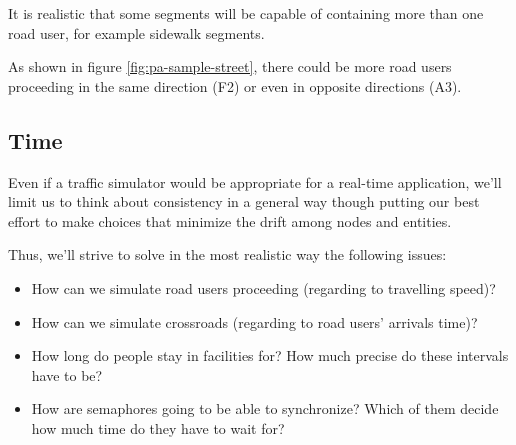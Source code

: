 It is realistic that some segments will be capable of containing more than one
road user, for example sidewalk segments.

As shown in figure \ref{fig:pa-sample-street}, there could be more road users
proceeding in the same direction (F2) or even in opposite directions (A3).

\subsection{Time}
Even if a traffic simulator would be appropriate for a real-time application,
we'll limit us to think about consistency in a general way though putting our
best effort to make choices that minimize the drift among nodes and entities.

Thus, we'll strive to solve in the most realistic way the following issues:

\begin{itemize}
\item How can we simulate road users proceeding (regarding to travelling
  speed)?
\item How can we simulate crossroads (regarding to road users' arrivals time)?
\item How long do people stay in facilities for? How much precise do these
  intervals have to be?
\item How are semaphores going to be able to synchronize? Which of them decide
  how much time do they have to wait for?
\end{itemize}
